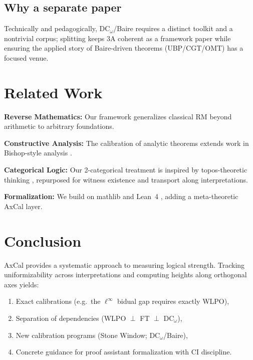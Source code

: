 \documentclass[11pt]{article}
\newcommand{\DCw}{\mathrm{DC}_\omega}
\newcommand{\linf}{\ell^\infty}
\begin{document}
\subsection{Why a separate paper}
Technically and pedagogically, DC$_\omega$/Baire requires a distinct toolkit and a nontrivial corpus; splitting keeps 3A coherent as a framework paper while ensuring the applied story of Baire-driven theorems (UBP/CGT/OMT) has a focused venue.

\section{Related Work}

\textbf{Reverse Mathematics:} Our framework generalizes classical RM \cite{Simpson} beyond arithmetic to arbitrary foundations.

\textbf{Constructive Analysis:} The calibration of analytic theorems extends work in Bishop-style analysis \cite{Bishop,BR}.

\textbf{Categorical Logic:} Our 2-categorical treatment is inspired by topos-theoretic thinking \cite{Johnstone}, repurposed for witness existence and transport along interpretations.

\textbf{Formalization:} We build on mathlib \cite{mathlib} and Lean~4 \cite{Lean4}, adding a meta-theoretic AxCal layer.

\section{Conclusion}

AxCal provides a systematic approach to measuring logical strength. Tracking uniformizability across interpretations and computing heights along orthogonal axes yields:
\begin{enumerate}
\item Exact calibrations (e.g.\ the $\linf$ bidual gap requires exactly WLPO),
\item Separation of dependencies (WLPO $\perp$ FT $\perp$ $\DCw$),
\item New calibration programs (Stone Window; DC$_\omega$/Baire),
\item Concrete guidance for proof assistant formalization with CI discipline.
\end{enumerate}
\end{document}
